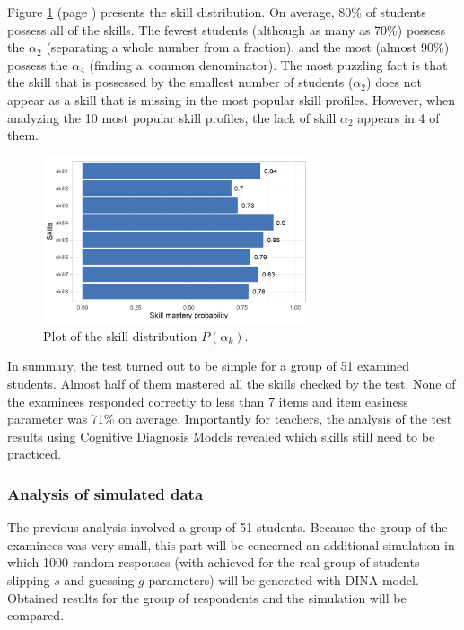 \documentclass[english]{pwr_wmat_praca_dyplomowa}
\theoremstyle{plain}
\numberwithin{theorem}{chapter}
\theoremstyle{definition}
\numberwithin{theorem}{chapter}
\begin{document}
	Figure \ref{skill_possession} (page \pageref{skill_possession}) presents the skill distribution. On average, 80\% of students possess all of the skills. The fewest students (although as many as 70\%) possess the $\alpha_2$ (separating a whole number from a fraction), and the most (almost 90\%) possess the $\alpha_4$ (finding a~common denominator). The most puzzling fact is that the skill that is possessed by the smallest number of students ($\alpha_2$) does not appear as a skill that is missing in the most popular skill profiles. However, when analyzing the 10 most popular skill profiles, the lack of skill $\alpha_2$ appears in 4 of them. 
	
	\begin{figure}[h!]
		\centering
		\includegraphics[width=0.7\textwidth]{Skill_mastery_probability.png}
		\caption{Plot of the skill distribution $P(\alpha_k)$.}
		\label{skill_possession}
	\end{figure}
	
	In summary, the test turned out to be simple for a group of 51 examined students. Almost half of them mastered all the skills checked by the test. None of the examinees responded correctly to less than 7 items and item easiness parameter was 71\% on average. Importantly for teachers, the analysis of the test results using Cognitive Diagnosis Models revealed which skills still need to be practiced.
	
	\subsubsection{Analysis of simulated data}
	The previous analysis involved a group of 51 students. Because the group of the examinees was very small, this part will be concerned an additional simulation in which 1000 random responses (with achieved for the real group of students slipping $s$ and guessing $g$ parameters) will be generated with DINA model. Obtained results for the group of respondents and the simulation will be compared.
	
\end{document}
